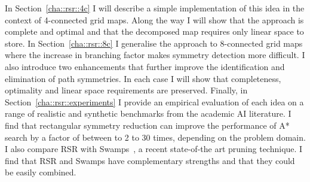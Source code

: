 In Section~\ref{cha::rsr::4c} I will describe a simple implementation of this idea
in the context of 4-connected grid maps. Along the way I will show that the approach 
is complete and optimal and that the decomposed map requires only linear space to store.
In Section~\ref{cha::rsr::8c} I generalise the approach to 8-connected grid maps
where the increase in branching factor makes symmetry detection more difficult. 
I also introduce two enhancements that further improve the identification and elimination 
of path symmetries. In each case I will show that completeness, optimality and linear
space requirements are preserved. Finally, in Section~\ref{cha::rsr::experiments} I provide an empirical
evaluation of each idea on a range of realistic and synthetic benchmarks from the academic
AI literature. I find that rectangular symmetry reduction can improve the performance of A* 
search by a factor of between to 2 to 30 times, depending on the problem domain. 
I also compare RSR with Swamps~\cite{pochter08}, a recent state-of-the art pruning 
technique. I find that RSR and Swamps have complementary strengths and that they could be
easily combined.

